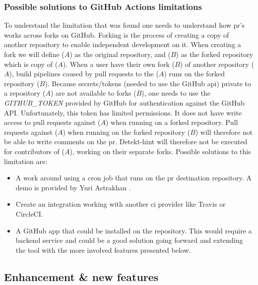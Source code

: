 \documentclass[pdftex,10pt,b5paper,twoside]{report}
\begin{document}
\subsubsection{Possible solutions to GitHub Actions limitations}

\label{possible-solutions}
To understand the limitation that was found one needs to understand how \gls{pr}'s works across forks on GitHub. Forking is the process of creating a copy of another repository to enable independent development on it. When creating a fork we will define ($A$) as the original repository, and ($B$) as the forked repository which is copy of ($A$). When a user have their own fork ($B$) of another repository ($A$), build pipelines caused by pull requests to the ($A$) runs on the forked repository ($B$). Because secrets/tokens (needed to use the GitHub \gls{api}) private to a repository ($A$) are not available to forks ($B$), one needs to use the \textit{GITHUB\_TOKEN} provided by GitHub for authentication against the GitHub API. Unfortunately, this token has limited permissions\cite{githubtoken}. It does not have write access to pull requests against  ($A$) when running on a forked repository. Pull requests against ($A$) when running on the forked repository ($B$) will therefore not be able to write comments on the \gls{pr}. Detekt-hint will therefore not be executed for contributors of ($A$), working on their separate forks. Possible solutions to this limitation are: 
\begin{itemize}
    \item A work around using a cron job that runs on the \gls{pr} destination repository. A demo is provided by Yuri Astrakhan \cite{workaround-demo}. 
    
    \item Create an integration working with another \gls{ci} provider like Travis or CircleCI. 
    
    \item A GitHub app that could be installed on the repository. This would require a backend service and could be a good solution going forward and extending the tool with the more involved features presented below.
\end{itemize}

\label{futurework}


\subsection*{Enhancement \& new features}
\end{document}
